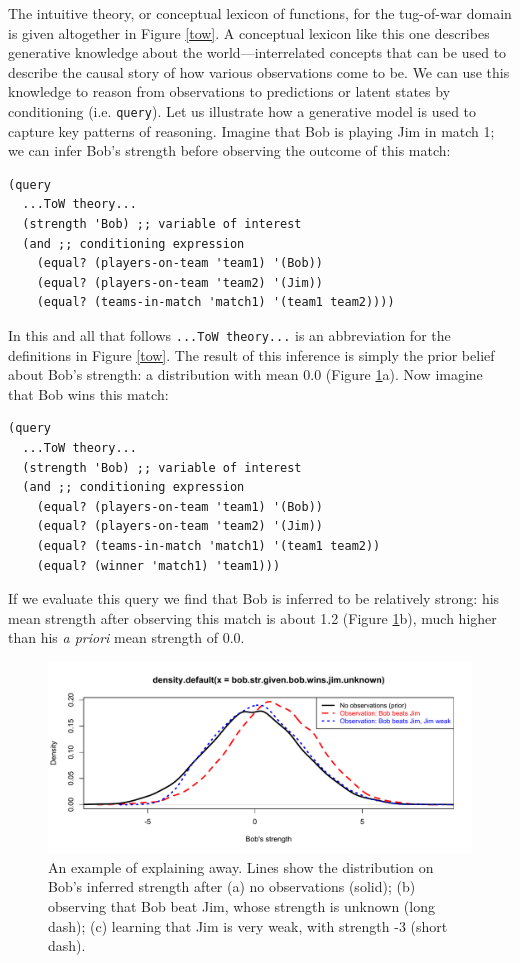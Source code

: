 \documentclass[pdfextras]{handbook}
\begin{document}
 
The intuitive theory, or conceptual lexicon of functions, for the tug-of-war domain is given altogether in Figure \ref{tow}.
A conceptual lexicon like this one describes generative knowledge about the world---interrelated concepts that can be used to describe the causal story of how various observations come to be. 
%
We can use this knowledge to reason from observations to predictions or latent states by conditioning (i.e. \lstinline{query}). 
Let us illustrate how a generative model is used to capture key patterns of reasoning. 
Imagine that Bob is playing Jim in match 1; we can infer Bob's strength before observing the outcome of this match:
\begin{lstlisting}[mathescape]
(query
  ...ToW theory...
  (strength 'Bob) ;; variable of interest
  (and ;; conditioning expression 
    (equal? (players-on-team 'team1) '(Bob))
    (equal? (players-on-team 'team2) '(Jim))
    (equal? (teams-in-match 'match1) '(team1 team2))))
\end{lstlisting}
In this and all that follows \lstinline{...ToW theory...} is an abbreviation for the definitions in Figure \ref{tow}. 
The result of this inference is simply the prior belief about Bob's strength: a distribution with mean 0.0 (Figure \ref{explainingaway}a).
%
Now imagine that Bob wins this match:
\begin{lstlisting}[mathescape]
(query
  ...ToW theory...
  (strength 'Bob) ;; variable of interest 
  (and ;; conditioning expression
    (equal? (players-on-team 'team1) '(Bob))
    (equal? (players-on-team 'team2) '(Jim))
    (equal? (teams-in-match 'match1) '(team1 team2))
    (equal? (winner 'match1) 'team1)))
\end{lstlisting}
If we evaluate this query we find that Bob is inferred to be relatively strong: his mean strength after observing this match is about 1.2 (Figure \ref{explainingaway}b), much higher than his \emph{a priori} mean strength of $0.0$. 

\begin{figure}[tbh]
\begin{center}
\includegraphics[scale=.5]{explaining-away-example.pdf}
\end{center}
\caption{An example of explaining away. 
Lines show the distribution on Bob's inferred strength after (a) no observations (solid); (b) observing that Bob beat Jim, whose strength is unknown (long dash); (c) learning that Jim is very weak, with strength -3 (short dash).}
\label{explainingaway}
\end{figure}
\end{document}
